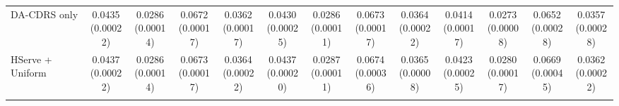 \begin{table}[t]
\begin{tabular*}{\textwidth}{@{\extracolsep{\fill}} l *{12}{c} @{}}
DA-CDRS only & \shortstack[c]{0.0435\\[-1pt]{\tiny(0.00022)}} & \shortstack[c]{0.0286\\[-1pt]{\tiny(0.00014)}} & \shortstack[c]{0.0672\\[-1pt]{\tiny(0.00017)}} & \shortstack[c]{0.0362\\[-1pt]{\tiny(0.00017)}} & \shortstack[c]{0.0430\\[-1pt]{\tiny(0.00025)}} & \shortstack[c]{0.0286\\[-1pt]{\tiny(0.00011)}} & \shortstack[c]{0.0673\\[-1pt]{\tiny(0.00017)}} & \shortstack[c]{0.0364\\[-1pt]{\tiny(0.00022)}} & \shortstack[c]{0.0414\\[-1pt]{\tiny(0.00017)}} & \shortstack[c]{0.0273\\[-1pt]{\tiny(0.00008)}} & \shortstack[c]{0.0652\\[-1pt]{\tiny(0.00028)}} & \shortstack[c]{0.0357\\[-1pt]{\tiny(0.00028)}} \\
HServe + Uniform & \shortstack[c]{0.0437\\[-1pt]{\tiny(0.00022)}} & \shortstack[c]{0.0286\\[-1pt]{\tiny(0.00014)}} & \shortstack[c]{0.0673\\[-1pt]{\tiny(0.00017)}} & \shortstack[c]{0.0364\\[-1pt]{\tiny(0.00022)}} & \shortstack[c]{0.0437\\[-1pt]{\tiny(0.00020)}} & \shortstack[c]{0.0287\\[-1pt]{\tiny(0.00011)}} & \shortstack[c]{0.0674\\[-1pt]{\tiny(0.00036)}} & \shortstack[c]{0.0365\\[-1pt]{\tiny(0.00008)}} & \shortstack[c]{0.0423\\[-1pt]{\tiny(0.00025)}} & \shortstack[c]{0.0280\\[-1pt]{\tiny(0.00017)}} & \shortstack[c]{0.0669\\[-1pt]{\tiny(0.00045)}} & \shortstack[c]{0.0362\\[-1pt]{\tiny(0.00022)}} \\
\addlinespace[1pt]

\end{tabular*}
\end{table}
